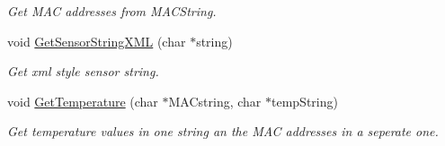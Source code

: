 \begin{DoxyCompactItemize}
\begin{DoxyCompactList}\small\item\em Get M\+AC addresses from M\+A\+C\+String. \end{DoxyCompactList}\item 
void \hyperlink{classDS18B20_a64a03b4a18a9d2b3faeb7943865055e9}{Get\+Sensor\+String\+X\+ML} (char $\ast$string)
\begin{DoxyCompactList}\small\item\em Get xml style sensor string. \end{DoxyCompactList}\item 
void \hyperlink{classDS18B20_ae3d50f1b5b71517d633958f54654ea55}{Get\+Temperature} (char $\ast$M\+A\+Cstring, char $\ast$temp\+String)
\begin{DoxyCompactList}\small\item\em Get temperature values in one string an the M\+AC addresses in a seperate one. \end{DoxyCompactList}\end{DoxyCompactItemize}
